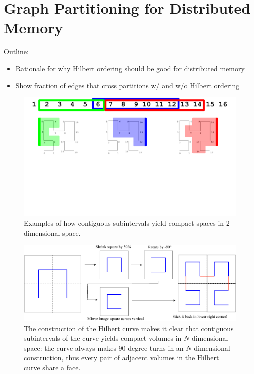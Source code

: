 \section{Graph Partitioning for Distributed Memory}
\label{sec:partitions}


Outline:
\begin{itemize}
\item Rationale for why Hilbert ordering should be good for distributed memory
\item Show fraction of edges that cross partitions w/ and w/o Hilbert ordering
\end{itemize}

\begin{figure}[h]
\centering
\includegraphics[width=5in,clip,trim=0 5cm 0 0]{hilbert_compact.pdf}
\caption{Examples of how contiguous subintervals yield compact
spaces in 2-dimensional space.}
\label{fig:hilbert_compact}
\end{figure}

\begin{figure}[h]
\centering
\includegraphics[width=5in,clip,trim=0 0 0 0]{fourthifs.jpg}
\caption{The construction of the Hilbert curve makes it
clear that contiguous subintervals of the curve yields
compact volumes in $N$-dimensional space: the curve always
makes 90 degree turns in an $N$-dimensional construction,
thus every pair of adjacent volumes in the Hilbert curve share a
face.}
\label{fig:hilbert_construction}
\end{figure}



